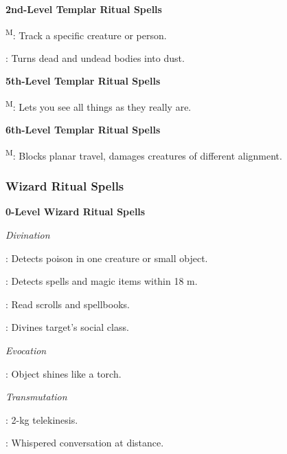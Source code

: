 \noindent\textbf{2nd-Level Templar Ritual Spells}
\begin{itemize*}
	\item[] \textsuperscript{M}: Track a specific creature or person.
	\item[] : Turns dead and undead bodies into dust.
\end{itemize*}

\noindent\textbf{5th-Level Templar Ritual Spells}
\begin{itemize*}
	\item[] \textsuperscript{M}: Lets you see all things as they really are.
\end{itemize*}

\noindent\textbf{6th-Level Templar Ritual Spells}
\begin{itemize*}
	\item[] \textsuperscript{M}: Blocks planar travel, damages creatures of different alignment.
\end{itemize*}




\subsubsection{Wizard Ritual Spells}
\noindent\textbf{0-Level Wizard Ritual Spells}

\noindent\textit{Divination}
\begin{itemize*}
	\item[] : Detects poison in one creature or small object.
	\item[] : Detects spells and magic items within 18 m.
	\item[] : Read scrolls and spellbooks.
	\item[] : Divines target's social class. %
\end{itemize*}

\noindent\textit{Evocation}
\begin{itemize*}
	\item[] : Object shines like a torch.
\end{itemize*}

\noindent\textit{Transmutation}
\begin{itemize*}
	\item[] : 2-kg telekinesis.
	\item[] : Whispered conversation at distance.
\end{itemize*}

